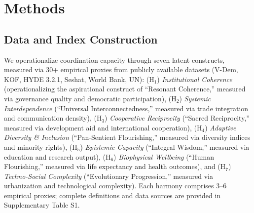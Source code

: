 \documentclass[11pt,letterpaper]{article}
\begin{document}
\section{Methods}

\subsection{Data and Index Construction}

We operationalize coordination capacity through seven latent constructs, measured via 30+ empirical proxies from publicly available datasets (V-Dem, KOF, HYDE 3.2.1, Seshat, World Bank, UN): (H$_1$) \textit{Institutional Coherence} (operationalizing the aspirational construct of ``Resonant Coherence,'' measured via governance quality and democratic participation), (H$_2$) \textit{Systemic Interdependence} (``Universal Interconnectedness,'' measured via trade integration and communication density), (H$_3$) \textit{Cooperative Reciprocity} (``Sacred Reciprocity,'' measured via development aid and international cooperation), (H$_4$) \textit{Adaptive Diversity \& Inclusion} (``Pan-Sentient Flourishing,'' measured via diversity indices and minority rights), (H$_5$) \textit{Epistemic Capacity} (``Integral Wisdom,'' measured via education and research output), (H$_6$) \textit{Biophysical Wellbeing} (``Human Flourishing,'' measured via life expectancy and health outcomes), and (H$_7$) \textit{Techno-Social Complexity} (``Evolutionary Progression,'' measured via urbanization and technological complexity). Each harmony comprises 3--6 empirical proxies; complete definitions and data sources are provided in Supplementary Table S1.
\end{document}
